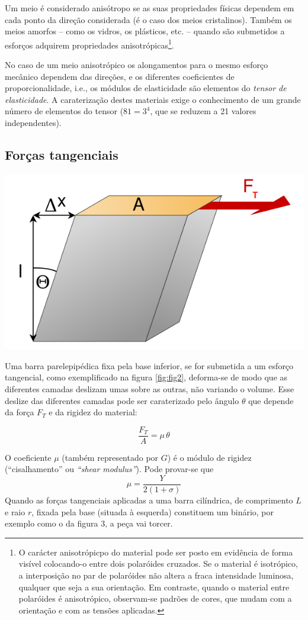 \documentclass[a4paper,12pt]{article}
\begin{document}
Um meio é considerado anisótropo se as suas propriedades físicas dependem em cada ponto da direção considerada (é o caso dos meios cristalinos). Também os meios amorfos -- como os vidros, os plásticos, etc. -- quando são submetidos a esforços adquirem propriedades anisotrópicas\footnote{O carácter anisotrópicpo do material pode ser posto em evidência de forma visível colocando-o entre dois polaróides cruzados. 
Se o material é isotrópico, a interposição no par de polaróides não altera a fraca intensidade luminosa, qualquer que seja a sua orientação. Em contraste, quando o material entre polaróides é anisotrópico, observam-se padrões de cores, que mudam com a orientação e com as tensões aplicadas.}.

No caso de um meio anisotrópico os alongamentos para o mesmo esforço mecânico dependem das direções, e os diferentes coeficientes de proporcionalidade, i.e., os módulos de elasticidade são elementos do \emph{tensor de elasticidade}. A caraterização destes materiais exige o conhecimento de um grande número de elementos do tensor ($81=3^4$, que se reduzem a 21 valores independentes).

\subsection{\sf Forças tangenciais }
\begin{center}
	\includegraphics[width=0.45\linewidth]{602px-Shear_scherung}
\end{center}
Uma barra parelepipédica fixa pela base inferior, se for submetida a um esforço tangencial, como exemplificado na figura \ref{fig:fig2}, deforma-se de modo que as diferentes camadas deslizam umas sobre as outras, não variando o volume. Esse deslize das diferentes camadas pode ser caraterizado pelo ângulo 
$\theta$ que depende da força $F_T$ e da rigidez do material:

\begin{equation}
	\label{eq:shear}
	 \frac{F_T}{A} = \mu \, \theta 
\end{equation}

O coeficiente $\mu$ (também representado por $G$) é o módulo de rigidez (“cisalhamento” ou \emph{“shear modulus”}). Pode provar-se que 
\begin{equation}
	\label{eq:mu}
	 \mu  = \frac{Y}{2(1 +\sigma )}
\end{equation}
Quando as forças tangenciais aplicadas a uma barra cilíndrica, de comprimento $L$ e raio $r$, fixada pela base (situada à esquerda) constituem um binário, por exemplo como o da figura 3, a peça vai torcer.
\end{document}

